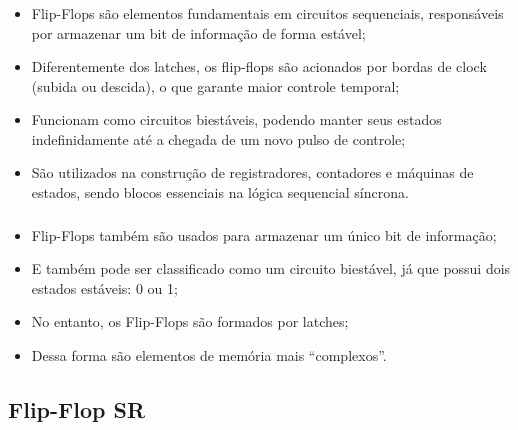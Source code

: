\documentclass{beamer}
\begin{document}
\begin{frame}
    \frametitle{\insertsection}
    \scriptsize
    \begin{itemize}
        \item Flip-Flops são elementos fundamentais em circuitos sequenciais, responsáveis por armazenar um bit de informação de forma estável;
        \item Diferentemente dos latches, os flip-flops são acionados por bordas de clock (subida ou descida), o que garante maior controle temporal;
        \item Funcionam como circuitos biestáveis, podendo manter seus estados indefinidamente até a chegada de um novo pulso de controle;
        \item São utilizados na construção de registradores, contadores e máquinas de estados, sendo blocos essenciais na lógica sequencial síncrona.
    \end{itemize}
\end{frame}

\begin{frame}
    \frametitle{\insertsection}
    \scriptsize
    \begin{itemize}
        \item Flip-Flops também são usados para armazenar um único bit de informação;
        \item E também pode ser classificado como um circuito biestável, já que possui dois estados estáveis: 0 ou 1;
        \item No entanto, os Flip-Flops são formados por latches;
        \item Dessa forma são elementos de memória mais ``complexos''.
    \end{itemize}
\end{frame}

\subsection{Flip-Flop SR}
\end{document}
